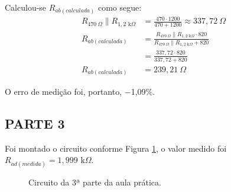 \documentclass[12pt]{article}
\begin{document}
    Calculou-se $R_{ab(calculada)}$ como segue:
    \begin{align*}
        R_{470\ \Omega}\parallel R_{1,2\text{ k}\Omega} &= \frac{470\cdot 1200}{470 + 1200} \approx 337,72\ \Omega \\
        R_{ab(calculada)}&=\frac{R_{470\ \Omega}\parallel R_{1,2\text{ k}\Omega}\cdot 820}{R_{470\ \Omega}\parallel R_{1,2\text{ k}\Omega} + 820}\\
        &=\frac{337,72\cdot 820}{337,72 + 820}\\
        R_{ab(calculada)}&=239,21\ \Omega
    \end{align*}

    O erro de medição foi, portanto, $-$1,09\%.

    \subsection{PARTE 3}
    Foi montado o circuito conforme Figura \ref{fig:circuito-parte3}, o valor medido foi $R_{ad(medida)}=1,999\text{ k}\Omega$.
    \begin{figure}[H]
        \centering
        \caption{Circuito da 3ª parte da aula prática.}
        \label{fig:circuito-parte3}
    \end{figure}
\end{document}
